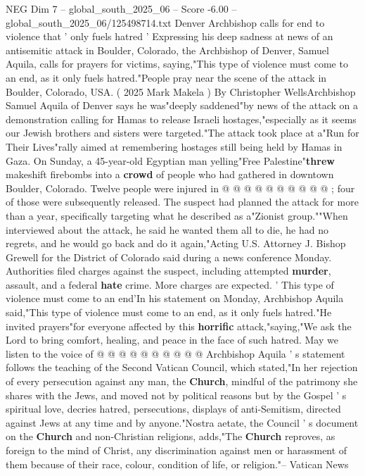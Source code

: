 \begin{textsample}{NEG Dim 7 – global\_south\_2025\_06 – Score -6.00 – global\_south\_2025\_06/125498714.txt}  \label{ex:f7_neg_272}
Denver Archbishop calls for end to violence that ' only fuels hatred ' Expressing his deep sadness at news of an antisemitic attack in Boulder, Colorado, the Archbishop of Denver, Samuel Aquila, calls for prayers for victims, saying,"This type of violence must come to an end, as it only fuels hatred."People pray near the scene of the attack in Boulder, Colorado, USA. ( 2025 Mark Makela ) By Christopher WellsArchbishop Samuel Aquila of Denver says he was"deeply saddened"by news of the attack on a demonstration calling for Hamas to release Israeli hostages,"especially as it seems our Jewish brothers and sisters were targeted."The attack took place at a"Run for Their Lives"rally aimed at remembering hostages still being held by Hamas in Gaza.
On Sunday, a 45-year-old Egyptian man yelling"Free Palestine"\textbf{threw} makeshift firebombs into a \textbf{crowd} of people who had gathered in downtown Boulder, Colorado.
Twelve people were injured in @ @ @ @ @ @ @ @ @ @ ; four of those were subsequently released.
The suspect had planned the attack for more than a year, specifically targeting what he described as a"Zionist group.""When interviewed about the attack, he said he wanted them all to die, he had no regrets, and he would go back and do it again,"Acting U.S.
Attorney J.
Bishop Grewell for the District of Colorado said during a news conference Monday.
Authorities filed charges against the suspect, including attempted \textbf{murder}, assault, and a federal \textbf{hate} crime.
More charges are expected. ' This type of violence must come to an end'In his statement on Monday, Archbishop Aquila said,"This type of violence must come to an end, as it only fuels hatred."He invited prayers"for everyone affected by this \textbf{horrific} attack,"saying,"We ask the Lord to bring comfort, healing, and peace in the face of such hatred.
May we listen to the voice of @ @ @ @ @ @ @ @ @ @ Archbishop Aquila ' s statement follows the teaching of the Second Vatican Council, which stated,"In her rejection of every persecution against any man, the \textbf{Church}, mindful of the patrimony she shares with the Jews, and moved not by political reasons but by the Gospel ' s spiritual love, decries hatred, persecutions, displays of anti-Semitism, directed against Jews at any time and by anyone."Nostra aetate, the Council ' s document on the \textbf{Church} and non-Christian religions, adds,"The \textbf{Church} reproves, as foreign to the mind of Christ, any discrimination against men or harassment of them because of their race, colour, condition of life, or religion."-- Vatican News

\end{textsample}
